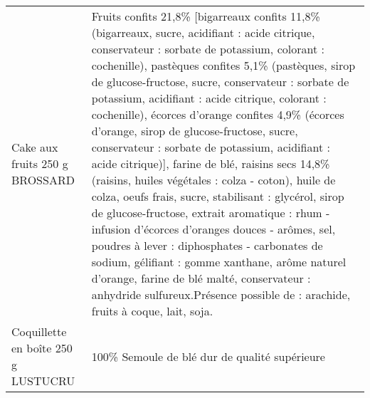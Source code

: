 \begin{longtable}{p{5cm}p{10cm}}
                                                                           Cake aux fruits 250 g BROSSARD &                                                                Fruits confits 21,8\% [bigarreaux confits 11,8\% (bigarreaux, sucre, acidifiant : acide citrique, conservateur : sorbate de potassium, colorant : cochenille), pastèques confites 5,1\% (pastèques, sirop de glucose-fructose, sucre, conservateur : sorbate de potassium, acidifiant : acide citrique, colorant : cochenille), écorces d'orange confites 4,9\% (écorces d'orange, sirop de glucose-fructose, sucre, conservateur : sorbate de potassium, acidifiant : acide citrique)], farine de blé, raisins secs 14,8\% (raisins, huiles végétales : colza - coton), huile de colza, oeufs frais, sucre, stabilisant : glycérol, sirop de glucose-fructose, extrait aromatique : rhum - infusion d'écorces d'oranges douces - arômes, sel, poudres à lever : diphosphates - carbonates de sodium, gélifiant : gomme xanthane, arôme naturel d'orange, farine de blé malté, conservateur : anhydride sulfureux.Présence possible de : arachide, fruits à coque, lait, soja. \\
                                                                      Coquillette en boîte 250 g LUSTUCRU &                                                                                                                                                                                                                                                                                                                                                                                                                                                                                                                                                                                                                                                                                                                                                                                                                                                                                                                                                                                            100\% Semoule de blé dur de qualité supérieure \\

\end{longtable}
